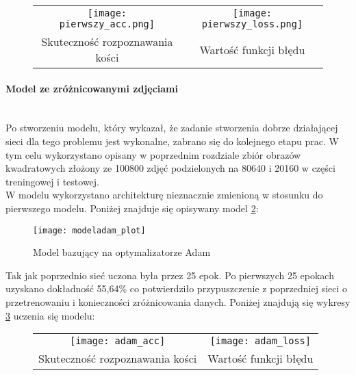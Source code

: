 \begin{figure}[h!]
\begin{center}
\begin{tabular}{cc}
\texttt{[image: pierwszy\_acc.png]} &
\texttt{[image: pierwszy\_loss.png]} \\
 Skuteczność rozpoznawania kości & Wartość funkcji błędu\\
\end{tabular}
\label{fig:first_plots}
\end{center}
\end{figure}

\paragraph{Model ze zróżnicowanymi zdjęciami} \mbox{}\\
Po stworzeniu modelu, który wykazał, że zadanie stworzenia dobrze działającej sieci dla
tego problemu jest wykonalne, zabrano się do kolejnego etapu prac. W tym celu
wykorzystano opisany w poprzednim rozdziale zbiór obrazów kwadratowych złożony ze 100800 zdjęć
podzielonych na 80640 i 20160 w części treningowej i testowej.\\
W modelu wykorzystano architekturę nieznacznie zmienioną w stosunku do pierwszego modelu.
Poniżej znajduje się opisywany model \ref{fig:adam}: \newpage

\begin{figure}[h!]
\centering
\texttt{[image: modeladam\_plot]}
\caption{Model bazujący na optymalizatorze Adam}
\label{fig:adam}
\end{figure}
Tak jak poprzednio sieć uczona była przez 25 epok.
Po pierwszych 25 epokach uzyskano dokładność 55,64\% co potwierdziło przypuszczenie
z poprzedniej sieci o przetrenowaniu i konieczności zróżnicowania danych.
Poniżej znajdują się wykresy \ref{fig:adam_plots} uczenia się modelu:
\newpage
\begin{figure}[h!]
\begin{center}
\begin{tabular}{cc}
\texttt{[image: adam\_acc]} &
\texttt{[image: adam\_loss]} \\
 Skuteczność rozpoznawania kości & Wartość funkcji błędu\\
\end{tabular}
\label{fig:adam_plots}
\end{center}
\end{figure}

